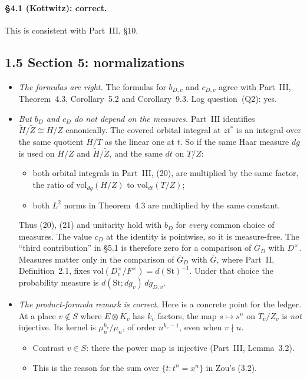 \documentclass[11pt]{article}
\newcommand{\Gb}{\overline G}
\newcommand{\GDb}{\overline G_D}
\newcommand{\tH}{\widetilde H}
\newcommand{\tZ}{\widetilde Z}
\theoremstyle{definition}
\begin{document}
\paragraph{\S4.1 (Kottwitz): correct.} This is consistent with
Part~III, \S10.

\subsection*{1.5 Section 5: normalizations}
\begin{itemize}
\item \emph{The formulas are right.} The formulas for $b_{D,v}$ and
$c_{D,v}$ agree with Part~III, Theorem~4.3, Corollary~5.2 and
Corollary~9.3. Log question~(Q2): yes.
\item \emph{But $b_D$ and $c_D$ do not depend on the measures.} Part~III
identifies $\tH/\tZ\cong H/Z$ canonically. The covered orbital integral
at $zt^*$ is an integral over the same quotient $H/T$ as the linear one
at $t$. So if the same Haar measure $dg$ is used on $H/Z$ and
$\tH/\tZ$, and the same $dt$ on $T/Z$:
\begin{itemize}
\item both orbital integrals in Part~III, (20), are multiplied by the
same factor, the ratio of $\mathrm{vol}_{dg}(H/Z)$ to
$\mathrm{vol}_{dt}(T/Z)$;
\item both $L^2$ norms in Theorem~4.3 are multiplied by the same constant.
\end{itemize}
Thus (20), (21) and unitarity hold with $b_D$ for \emph{every} common choice
of measures. The value $c_D$ at the identity is pointwise, so it is
measure-free. The ``third contribution'' in \S5.1 is therefore zero for
a comparison of $\GDb$ with $D^\times$. Measures matter only in the
comparison of $\GDb$ with $\Gb$, where Part~II, Definition~2.1, fixes
$\mathrm{vol}(D_v^\times/F^\times)=d(\mathrm{St})^{-1}$. Under that
choice the probability measure is $d(\mathrm{St};dg_v)\,dg_{D,v}$.
\item \emph{The product-formula remark is correct.} Here is a concrete point
for the ledger. At a place $v\notin S$ where $E\otimes K_v$ has $k_v$
factors, the map $s\mapsto s^n$ on $T_v/Z_v$ is \emph{not} injective. Its
kernel is $\mu_n^{k_v}/\mu_n$, of order $n^{k_v-1}$, even when $v\nmid n$.
\begin{itemize}
\item Contrast $v\in S$: there the power map is injective (Part~III,
Lemma~3.2).
\item This is the reason for the sum over $\{t:t^n=x^n\}$ in Zou's (3.2).

\end{itemize}
\end{itemize}
\end{document}
